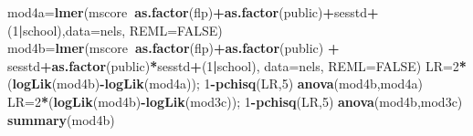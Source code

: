 \documentclass[ignorenonframetext,]{beamer}
\newenvironment{Shaded}{\begin{snugshade}}{\end{snugshade}}
\newcommand{\KeywordTok}[1]{\textcolor[rgb]{0.13,0.29,0.53}{\textbf{#1}}}
\newcommand{\DataTypeTok}[1]{\textcolor[rgb]{0.13,0.29,0.53}{#1}}
\newcommand{\DecValTok}[1]{\textcolor[rgb]{0.00,0.00,0.81}{#1}}
\newcommand{\StringTok}[1]{\textcolor[rgb]{0.31,0.60,0.02}{#1}}
\newcommand{\OtherTok}[1]{\textcolor[rgb]{0.56,0.35,0.01}{#1}}
\newcommand{\OperatorTok}[1]{\textcolor[rgb]{0.81,0.36,0.00}{\textbf{#1}}}
\newcommand{\NormalTok}[1]{#1}
\begin{document}
\begin{frame}[fragile]{}

\begin{Shaded}
\begin{Highlighting}[]
\NormalTok{mod4a=}\KeywordTok{lmer}\NormalTok{(mscore}\OperatorTok{~}\KeywordTok{as.factor}\NormalTok{(flp)}\OperatorTok{+}\KeywordTok{as.factor}\NormalTok{(public)}\OperatorTok{+}\NormalTok{sesstd}\OperatorTok{+}
\StringTok{            }\NormalTok{(}\DecValTok{1}\OperatorTok{|}\NormalTok{school),}\DataTypeTok{data=}\NormalTok{nels, }\DataTypeTok{REML=}\OtherTok{FALSE}\NormalTok{)}
\NormalTok{mod4b=}\KeywordTok{lmer}\NormalTok{(mscore}\OperatorTok{~}\KeywordTok{as.factor}\NormalTok{(flp)}\OperatorTok{+}\KeywordTok{as.factor}\NormalTok{(public) }\OperatorTok{+}
\StringTok{             }\NormalTok{sesstd}\OperatorTok{+}\KeywordTok{as.factor}\NormalTok{(public)}\OperatorTok{*}\NormalTok{sesstd}\OperatorTok{+}\NormalTok{(}\DecValTok{1}\OperatorTok{|}\NormalTok{school),}
           \DataTypeTok{data=}\NormalTok{nels, }\DataTypeTok{REML=}\OtherTok{FALSE}\NormalTok{)}
\NormalTok{LR=}\DecValTok{2}\OperatorTok{*}\NormalTok{(}\KeywordTok{logLik}\NormalTok{(mod4b)}\OperatorTok{-}\KeywordTok{logLik}\NormalTok{(mod4a)); }\DecValTok{1}\OperatorTok{-}\KeywordTok{pchisq}\NormalTok{(LR,}\DecValTok{5}\NormalTok{)}
\KeywordTok{anova}\NormalTok{(mod4b,mod4a)}
\NormalTok{LR=}\DecValTok{2}\OperatorTok{*}\NormalTok{(}\KeywordTok{logLik}\NormalTok{(mod4b)}\OperatorTok{-}\KeywordTok{logLik}\NormalTok{(mod3c)); }\DecValTok{1}\OperatorTok{-}\KeywordTok{pchisq}\NormalTok{(LR,}\DecValTok{5}\NormalTok{)}
\KeywordTok{anova}\NormalTok{(mod4b,mod3c)}
\KeywordTok{summary}\NormalTok{(mod4b)}
\end{Highlighting}
\end{Shaded}

\end{frame}
\end{document}
